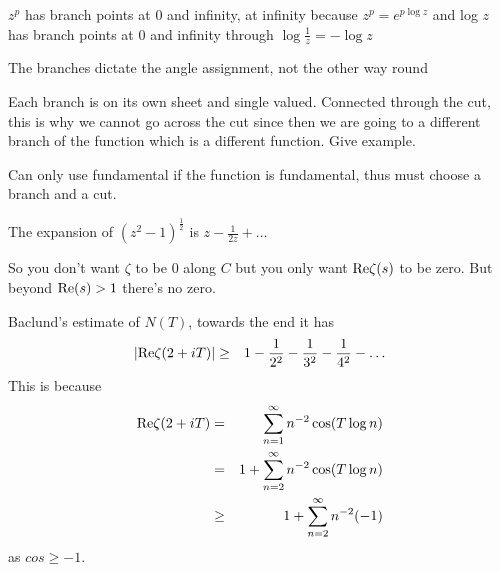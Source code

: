 \documentclass[aps,preprint,preprintnumbers,nofootinbib,showpacs,prd]{revtex4-1}
\newcommand{\nbea}{\begin{eqnarray*}}
\newcommand{\neea}{\end{eqnarray*}}
\newcommand{\re}{{\rm Re}}
\begin{document}
$z^p$ has branch points at 0 and infinity, at infinity because $z^p = e^{p \log z}$ and log $z$ has branch points at 0 and infinity through $\log \tfrac{1}{z} = -\log z$



The branches dictate the angle assignment, not the other way round

Each branch is on its own sheet and single valued. Connected through the cut, this is why we cannot go across the cut since then we are going to a different branch of the function which is a different function. Give example.

Can only use fundamental if the function is fundamental, thus must choose a branch and a cut.

The expansion of $(z^2 - 1)^{\tfrac{1}{2}}$ is $z - \frac{1}{2z} + \dots$










So you don't want $\zeta$ to be 0 along $C$ but you only want $\re \zeta(s)$ to be zero. But beyond $\re(s) > 1$ there's no zero.




Baclund's estimate of $N(T)$, towards the end it has
%
\nbea
\left | \re\zeta(2 + iT)\right | & \ge & 1 - \frac{1}{2^2} - \frac{1}{3^2}- \frac{1}{4^2} - \dots
\neea
%
This is because
%
\nbea
\re\zeta(2 + iT) & = & \sum_{n=1}^\infty n^{-2} \cos(T\log n) \\
& = & 1 + \sum_{n=2}^\infty n^{-2} \cos(T\log n) \\
& \ge & 1 + \sum_{n=2}^\infty n^{-2} (-1)
\neea
%
as $cos \ge -1$.
\end{document}

